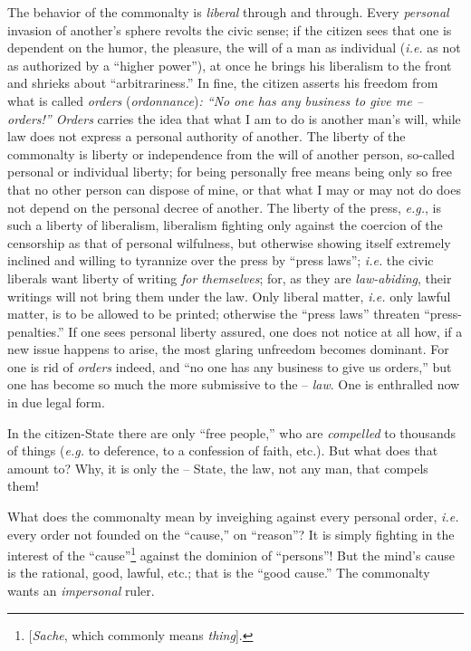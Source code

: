 \documentclass[12pt,a4paper]{book}
\begin{document}
The behavior of the commonalty is \textit{liberal} through and through. Every 
\textit{personal} invasion of another's sphere revolts the civic sense; if the 
citizen sees that one is dependent on the humor, the pleasure, the will of a 
man as individual (\textit{i.e.} as not as authorized by a ``higher 
power''), at once he brings his liberalism to the front and shrieks about 
``arbitrariness.'' In fine, the citizen asserts his freedom from what is 
called \textit{orders} (\textit{ordonnance})\textit{: ``No one has any 
business to give me -- orders!'' Orders} carries the idea that what I am to 
do is another man's will, while law does not express a personal authority of 
another. The liberty of the commonalty is liberty or independence from the 
will of another person, so-called personal or individual liberty; for being 
personally free means being only so free that no other person can dispose of 
mine, or that what I may or may not do does not depend on the personal decree 
of another. The liberty of the press, \textit{e.g.}, is such a liberty of 
liberalism, liberalism fighting only against the coercion of the censorship as 
that of personal wilfulness, but otherwise showing itself extremely inclined 
and willing to tyrannize over the press by ``press laws''; \textit{i.e.} the 
civic liberals want liberty of writing \textit{for themselves}; for, as they 
are \textit{law-abiding}, their writings will not bring them under the law. 
Only liberal matter, \textit{i.e.} only lawful matter, is to be allowed to be 
printed; otherwise the ``press laws'' threaten ``press-penalties.'' If one 
sees personal liberty assured, one does not notice at all how, if a new issue 
happens to arise, the most glaring unfreedom becomes dominant. For one is rid 
of \textit{orders} indeed, and ``no one has any business to give us 
orders,'' but one has become so much the more submissive to the -- 
\textit{law}. One is enthralled now in due legal form.

In the citizen-State there are only ``free people,'' who are 
\textit{compelled} to thousands of things (\textit{e.g.} to deference, to a 
confession of faith, etc.). But what does that amount to? Why, it is only the 
-- State, the law, not any man, that compels them!

What does the commonalty mean by inveighing against every personal order, 
\textit{i.e.} every order not founded on the ``cause,'' on ``reason''? It 
is simply fighting in the interest of the 
``cause''\footnote{[\textit{Sache}, which commonly means \textit{thing}].} 
against the dominion of ``persons''! But the mind's cause is the rational, 
good, lawful, etc.; that is the ``good cause.'' The commonalty wants an 
\textit{impersonal} ruler.
\end{document}
